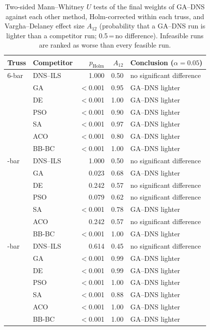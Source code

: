 \begin{table}[tbp]
\centering\small
\caption{Two-sided Mann--Whitney $U$ tests of the final weights of GA--DNS against
each other method, Holm-corrected within each truss, and Vargha--Delaney effect size
$A_{12}$ (probability that a GA--DNS run is lighter than a competitor run;
0.5\,=\,no difference). Infeasible runs are ranked as worse than every feasible run.}
\label{tab:tests}
\begin{tabular}{@{}llrrl@{}}
\toprule
Truss & Competitor & $p_{\mathrm{Holm}}$ & $A_{12}$ & Conclusion ($\alpha=0.05$)\\
\midrule
6-bar & DNS--ILS & 1.000 & 0.50 & no significant difference\\
 & GA & $<$0.001 & 0.95 & GA--DNS lighter\\
 & DE & $<$0.001 & 1.00 & GA--DNS lighter\\
 & PSO & $<$0.001 & 0.90 & GA--DNS lighter\\
 & SA & $<$0.001 & 0.97 & GA--DNS lighter\\
 & ACO & $<$0.001 & 0.80 & GA--DNS lighter\\
 & BB-BC & $<$0.001 & 1.00 & GA--DNS lighter\\
\addlinespace
25-bar & DNS--ILS & 1.000 & 0.50 & no significant difference\\
 & GA & 0.023 & 0.68 & GA--DNS lighter\\
 & DE & 0.242 & 0.57 & no significant difference\\
 & PSO & 0.079 & 0.62 & no significant difference\\
 & SA & $<$0.001 & 0.78 & GA--DNS lighter\\
 & ACO & 0.242 & 0.57 & no significant difference\\
 & BB-BC & $<$0.001 & 1.00 & GA--DNS lighter\\
\addlinespace
72-bar & DNS--ILS & 0.614 & 0.45 & no significant difference\\
 & GA & $<$0.001 & 0.99 & GA--DNS lighter\\
 & DE & $<$0.001 & 0.99 & GA--DNS lighter\\
 & PSO & $<$0.001 & 1.00 & GA--DNS lighter\\
 & SA & $<$0.001 & 0.88 & GA--DNS lighter\\
 & ACO & $<$0.001 & 1.00 & GA--DNS lighter\\
 & BB-BC & $<$0.001 & 1.00 & GA--DNS lighter\\
\bottomrule
\end{tabular}
\end{table}
